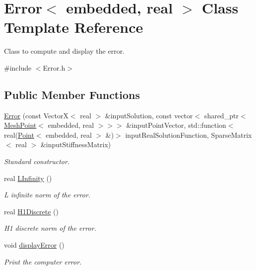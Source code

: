 \hypertarget{class_error}{\section{\-Error$<$ embedded, real $>$ \-Class \-Template \-Reference}
\label{class_error}
}


\-Class to compute and display the error.  




{\ttfamily \#include $<$\-Error.\-h$>$}

\subsection*{\-Public \-Member \-Functions}
\begin{DoxyCompactItemize}
\item 
\hyperlink{class_error_aefce6e56298750a38873378411ff3d55}{\-Error} (const \-Vector\-X$<$ real $>$ \&input\-Solution, const vector$<$ shared\-\_\-ptr$<$ \hyperlink{class_mesh_point}{\-Mesh\-Point}$<$ embedded, real $>$$>$$>$ \&input\-Point\-Vector, std\-::function$<$ real(\hyperlink{class_point}{\-Point}$<$ embedded, real $>$ \&)$>$ input\-Real\-Solution\-Function, \-Sparse\-Matrix$<$ real $>$ \&input\-Stiffness\-Matrix)
\begin{DoxyCompactList}\small\item\em \-Standard constructor. \end{DoxyCompactList}\item 
real \hyperlink{class_error_a7a04e88a927c4e4c701e7f482cb97c59}{\-L\-Infinity} ()
\begin{DoxyCompactList}\small\item\em \-L infinite norm of the error. \end{DoxyCompactList}\item 
real \hyperlink{class_error_a3e3b35dcf91c1e27cee2fb546d2b9f7d}{\-H1\-Discrete} ()
\begin{DoxyCompactList}\small\item\em \-H1 discrete norm of the error. \end{DoxyCompactList}\item 
\hypertarget{class_error_a59f271538fe208ba18e7ed31d0513e83}{void \hyperlink{class_error_a59f271538fe208ba18e7ed31d0513e83}{display\-Error} ()}\label{class_error_a59f271538fe208ba18e7ed31d0513e83}

\begin{DoxyCompactList}\small\item\em \-Print the computer error. \end{DoxyCompactList}\end{DoxyCompactItemize}
